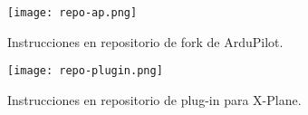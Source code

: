 \begin{figure}[h]
    \centering
    \texttt{[image: repo-ap.png]}
    \caption{Instrucciones en repositorio de fork de ArduPilot.}
    \label{fig:repo-ap}
\end{figure}

\begin{figure}[h]
    \centering
    \texttt{[image: repo-plugin.png]}
    \caption{Instrucciones en repositorio de plug-in para X-Plane.}
    \label{fig:repo-plugin}
\end{figure}